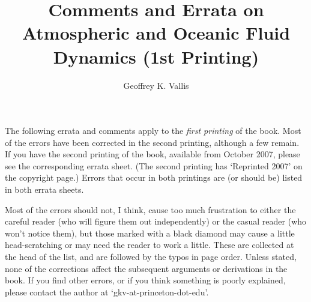\documentclass[10pt]{article}
\begin{document}
\title{\sffamily Comments and Errata on Atmospheric and Oceanic Fluid Dynamics (1st Printing)}
\author{\sffamily Geoffrey K. Vallis}
\maketitle
%

\noindent 


The following errata and comments apply to the \emph{first printing} of the book. Most of the errors have been corrected in the second printing, although a few remain. If you have the second printing of the book, available from October 2007, please see the corresponding errata sheet. (The second printing has `Reprinted 2007' on the copyright page.) Errors that occur in both printings are (or should be) listed in both errata sheets.

Most of the errors should not, I think, cause too much frustration to either the careful reader (who will figure them out independently) or the casual reader (who won't notice them), but those marked with a black diamond may cause a little head-scratching or may need the reader to work a little. These are collected at the head of the list, and are followed by the typos in page order. Unless stated, none of the corrections affect the subsequent arguments or derivations in the book. If you find other errors, or if you think something is poorly explained, please contact the author at `gkv-at-princeton-dot-edu'. 
\end{document}
